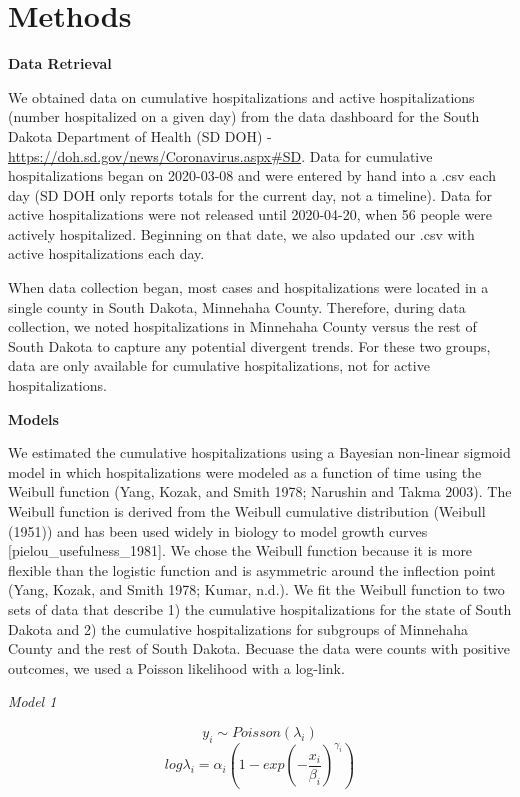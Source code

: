 \documentclass[
]{article}
\begin{document}
\hypertarget{methods}{%
\section{Methods}\label{methods}}

\textbf{Data Retrieval}

We obtained data on cumulative hospitalizations and active hospitalizations (number hospitalized on a given day) from the data dashboard for the South Dakota Department of Health (SD DOH) - \url{https://doh.sd.gov/news/Coronavirus.aspx\#SD}. Data for cumulative hospitalizations began on 2020-03-08 and were entered by hand into a .csv each day (SD DOH only reports totals for the current day, not a timeline). Data for active hospitalizations were not released until 2020-04-20, when 56 people were actively hospitalized. Beginning on that date, we also updated our .csv with active hospitalizations each day.

When data collection began, most cases and hospitalizations were located in a single county in South Dakota, Minnehaha County. Therefore, during data collection, we noted hospitalizations in Minnehaha County versus the rest of South Dakota to capture any potential divergent trends. For these two groups, data are only available for cumulative hospitalizations, not for active hospitalizations.

\textbf{Models}

We estimated the cumulative hospitalizations using a Bayesian non-linear sigmoid model in which hospitalizations were modeled as a function of time using the Weibull function (Yang, Kozak, and Smith 1978; Narushin and Takma 2003). The Weibull function is derived from the Weibull cumulative distribution (Weibull (1951)) and has been used widely in biology to model growth curves {[}pielou\_usefulness\_1981{]}. We chose the Weibull function because it is more flexible than the logistic function and is asymmetric around the inflection point (Yang, Kozak, and Smith 1978; Kumar, n.d.). We fit the Weibull function to two sets of data that describe 1) the cumulative hospitalizations for the state of South Dakota and 2) the cumulative hospitalizations for subgroups of Minnehaha County and the rest of South Dakota. Becuase the data were counts with positive outcomes, we used a Poisson likelihood with a log-link.

\emph{Model 1}

\[y_i \sim Poisson(\lambda_i)\]
\[log\lambda_i = \alpha_i(1 - exp(-\frac{x_i}{\beta_i})^{\gamma_i})\]
\end{document}
